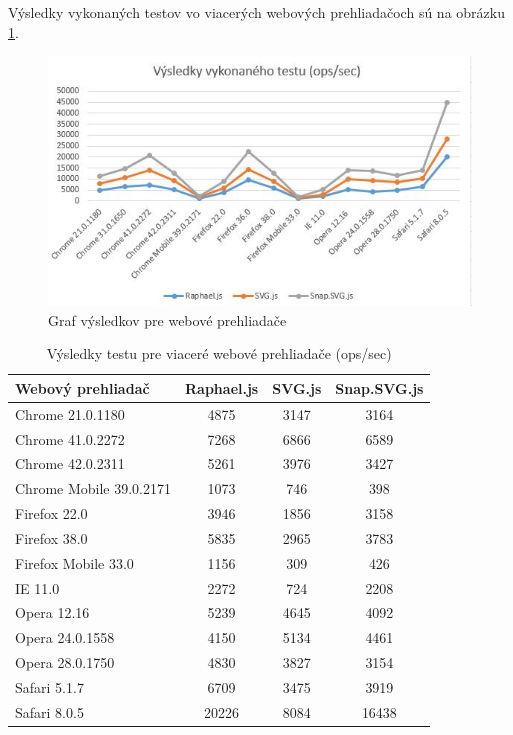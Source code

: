 Výsledky vykonaných testov vo viacerých webových prehliadačoch sú na obrázku \ref{fig:graf3}.

 \begin{figure}[H]
\centering
\includegraphics[width=0.9\linewidth]{obrazky/graf3.JPG}
\caption{Graf výsledkov pre webové prehliadače}
\label{fig:graf3}
\end{figure}


\begin{table}[H] \begin{center} \begin{tabular}{|l|c|c|c|} \hline \textbf{Webový prehliadač} & \textbf{Raphael.js} & \textbf{SVG.js} & \textbf{Snap.SVG.js}  \\ \hline Chrome 21.0.1180 & 4875 & 3147 & 3164  \\ \hline Chrome 41.0.2272 & 7268 & 6866 & 6589  \\ \hline Chrome 42.0.2311 & 5261 & 3976 & 3427  \\ \hline Chrome Mobile 39.0.2171 & 1073 & 746 & 398  \\ \hline Firefox 22.0 & 3946 & 1856 & 3158 \\ \hline Firefox 38.0 & 5835 & 2965 & 3783 \\ \hline Firefox Mobile 33.0 & 1156 & 309 & 426 \\ \hline IE 11.0 & 2272 & 724 & 2208 \\ \hline Opera 12.16  & 5239 & 4645 & 4092 \\ \hline Opera 24.0.1558 & 4150 & 5134 & 4461\\ \hline Opera 28.0.1750 & 4830 & 3827 & 3154 \\ \hline Safari 5.1.7 & 6709 & 3475 & 3919\\ \hline Safari 8.0.5 & 20226 & 8084 & 16438 \\ \hline \end{tabular} 
	
\end{center}
	\caption{Výsledky testu pre viaceré webové prehliadače (ops/sec)}
	\label{tab:test3}
\end{table}




